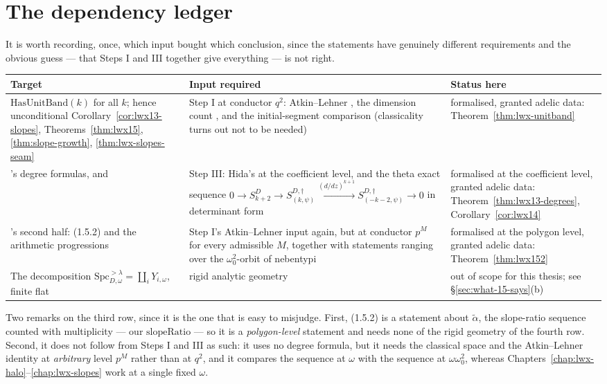 \section{The dependency ledger}
\label{sec:ledger}

It is worth recording, once, which input bought which conclusion, since the statements have
genuinely different requirements and the obvious guess --- that Steps I and III together give
everything --- is not right.

\begin{center}
\small
\begin{tabular}{p{}p{}p{}}
  \hline
  \textbf{Target} & \textbf{Input required} & \textbf{Status here} \\
  \hline
  $\mathrm{HasUnitBand}(k)$ for all $k$; hence unconditional
    Corollary~\ref{cor:lwx13-slopes}, Theorems~\ref{thm:lwx15}, \ref{thm:slope-growth},
    \ref{thm:lwx-slopes-seam}
  & Step I at conductor $q^{2}$: Atkin--Lehner \cite[Prop.~3.22]{LWX}, the dimension count
    \cite[(3.21.1)]{LWX}, and the initial-segment comparison (classicality
    \cite[Prop.~2.15]{LWX} turns out not to be needed)
  & formalised, granted adelic data: Theorem~\ref{thm:lwx-unitband} \\
  \hline
  \cite[Thm.~1.3]{LWX}'s degree formulas, and \cite[Cor.~1.4]{LWX}
  & Step III: Hida's \cite[Cor.~3.21]{LWX} at the coefficient level, and the theta exact sequence
    $0 \to S^{D}_{k+2} \to S^{D,\dagger}_{(k,\psi)} \xrightarrow{(d/dz)^{k+1}}
     S^{D,\dagger}_{(-k-2,\psi)} \to 0$ in determinant form
  & formalised at the coefficient level, granted adelic data: Theorem~\ref{thm:lwx13-degrees},
    Corollary~\ref{cor:lwx14} \\
  \hline
  \cite[Thm.~1.5]{LWX}'s second half: (1.5.2) and the arithmetic progressions
  & Step I's Atkin--Lehner input again, but at conductor $p^{M}$ for every admissible $M$,
    together with statements ranging over the $\omega_0^{2}$-orbit of nebentypi
  & formalised at the polygon level, granted adelic data: Theorem~\ref{thm:lwx152} \\
  \hline
  The decomposition $\mathrm{Spc}^{>\lambda}_{D,\omega} = \coprod_i Y_{i,\omega}$, finite flat
  & rigid analytic geometry
  & out of scope for this thesis; see \S\ref{sec:what-15-says}(b) \\
  \hline
\end{tabular}
\end{center}

Two remarks on the third row, since it is the one that is easy to misjudge.  First, (1.5.2) is a
statement about $\tilde\alpha$, the slope-ratio sequence counted with multiplicity --- our
$\mathrm{slopeRatio}$ --- so it is a \emph{polygon-level} statement and needs none of the rigid
geometry of the fourth row.  Second, it does not follow from Steps I and III as such: it uses no
degree formula, but it needs the classical space and the Atkin--Lehner identity at
\emph{arbitrary} level $p^{M}$ rather than at $q^{2}$, and it compares the sequence at $\omega$
with the sequence at $\omega\omega_0^{2}$, whereas
Chapters~\ref{chap:lwx-halo}--\ref{chap:lwx-slopes} work at a single fixed $\omega$.

